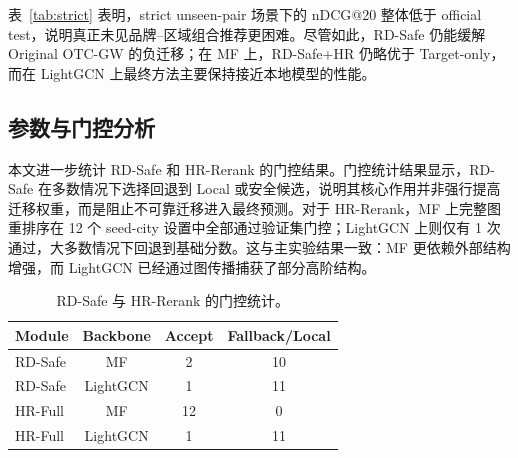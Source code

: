 \documentclass[10pt,twocolumn]{ctexart}
\begin{document}
\begin{table}[H]
\centering
\caption{Strict unseen-pair 鲁棒性分析：四城市平均 nDCG@20。}
\label{tab:strict}
\small
\setlength{\tabcolsep}{3pt}
\end{table}


表~\ref{tab:strict} 表明，strict unseen-pair 场景下的 nDCG@20 整体低于 official test，说明真正未见品牌--区域组合推荐更困难。尽管如此，RD-Safe 仍能缓解 Original OTC-GW 的负迁移；在 MF 上，RD-Safe+HR 仍略优于 Target-only，而在 LightGCN 上最终方法主要保持接近本地模型的性能。

\subsection{参数与门控分析}

本文进一步统计 RD-Safe 和 HR-Rerank 的门控结果。门控统计结果显示，RD-Safe 在多数情况下选择回退到 Local 或安全候选，说明其核心作用并非强行提高迁移权重，而是阻止不可靠迁移进入最终预测。对于 HR-Rerank，MF 上完整图重排序在 12 个 seed-city 设置中全部通过验证集门控；LightGCN 上则仅有 1 次通过，大多数情况下回退到基础分数。这与主实验结果一致：MF 更依赖外部结构增强，而 LightGCN 已经通过图传播捕获了部分高阶结构。

\begin{table}[H]
\centering
\caption{RD-Safe 与 HR-Rerank 的门控统计。}
\label{tab:gate}
\begin{tabular}{lccc}
\toprule
Module & Backbone & Accept & Fallback/Local \\
\midrule
RD-Safe & MF & 2 & 10 \\
RD-Safe & LightGCN & 1 & 11 \\
HR-Full & MF & 12 & 0 \\
HR-Full & LightGCN & 1 & 11 \\
\bottomrule
\end{tabular}
\end{table}
\end{document}
